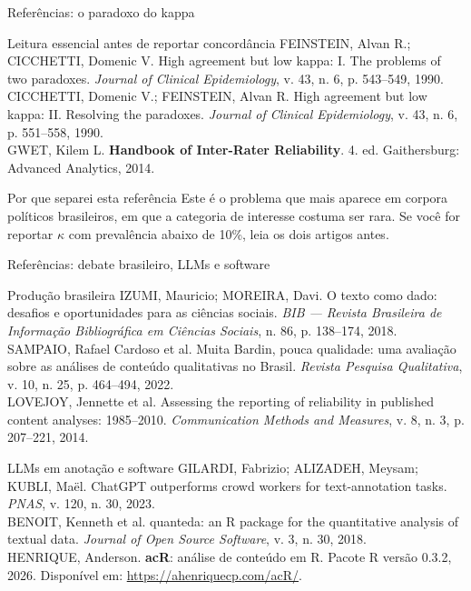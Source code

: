\documentclass[11pt,aspectratio=169]{beamer}
\begin{document}
\begin{frame}{Referências: o paradoxo do kappa}
\scriptsize
\begin{block}{Leitura essencial antes de reportar concordância}
FEINSTEIN, Alvan R.; CICCHETTI, Domenic V. High agreement but low kappa: I. The
problems of two paradoxes. \textit{Journal of Clinical Epidemiology}, v. 43,
n. 6, p. 543--549, 1990.\\[3pt]
CICCHETTI, Domenic V.; FEINSTEIN, Alvan R. High agreement but low kappa: II.
Resolving the paradoxes. \textit{Journal of Clinical Epidemiology}, v. 43, n. 6,
p. 551--558, 1990.\\[3pt]
GWET, Kilem L. \textbf{Handbook of Inter-Rater Reliability}. 4. ed.
Gaithersburg: Advanced Analytics, 2014.
\end{block}
\vspace{0.2cm}
\normalsize
\begin{block}{Por que separei esta referência}
\small Este é o problema que mais aparece em corpora políticos brasileiros, em
que a categoria de interesse costuma ser rara. Se você for reportar $\kappa$ com
prevalência abaixo de 10\%, leia os dois artigos antes.
\end{block}
\end{frame}

\begin{frame}{Referências: debate brasileiro, LLMs e software}
\scriptsize
\begin{block}{Produção brasileira}
IZUMI, Mauricio; MOREIRA, Davi. O texto como dado: desafios e oportunidades para
as ciências sociais. \textit{BIB — Revista Brasileira de Informação
Bibliográfica em Ciências Sociais}, n. 86, p. 138--174, 2018.\\[2pt]
SAMPAIO, Rafael Cardoso et al. Muita Bardin, pouca qualidade: uma avaliação
sobre as análises de conteúdo qualitativas no Brasil. \textit{Revista Pesquisa
Qualitativa}, v. 10, n. 25, p. 464--494, 2022.\\[2pt]
LOVEJOY, Jennette et al. Assessing the reporting of reliability in published
content analyses: 1985--2010. \textit{Communication Methods and Measures}, v. 8,
n. 3, p. 207--221, 2014.
\end{block}
\begin{block}{LLMs em anotação e software}
GILARDI, Fabrizio; ALIZADEH, Meysam; KUBLI, Maël. ChatGPT outperforms crowd
workers for text-annotation tasks. \textit{PNAS}, v. 120, n. 30, 2023.\\[2pt]
BENOIT, Kenneth et al. quanteda: an R package for the quantitative analysis of
textual data. \textit{Journal of Open Source Software}, v. 3, n. 30, 2018.\\[2pt]
HENRIQUE, Anderson. \textbf{acR}: análise de conteúdo em R. Pacote R versão
0.3.2, 2026. Disponível em: \url{https://ahenriquecp.com/acR/}.
\end{block}
\end{frame}
\end{document}
